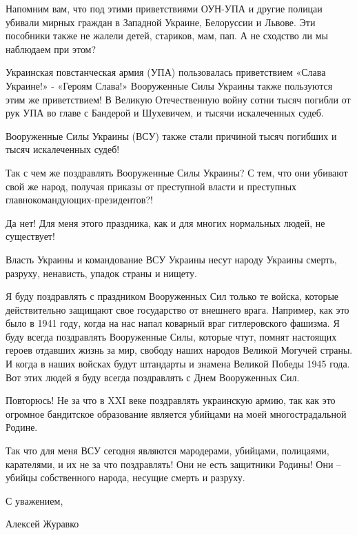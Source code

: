 Напомним вам, что под этими приветствиями ОУН-УПА и другие полицаи убивали
мирных граждан в Западной Украине, Белоруссии и Львове. Эти пособники также не
жалели детей, стариков, мам, пап. А не сходство ли мы наблюдаем при этом? 

Украинская повстанческая армия (УПА) пользовалась приветствием «Слава Украине!»
- «Героям Слава!» Вооруженные Силы Украины также пользуются этим же
приветствием! В Великую Отечественную войну сотни тысяч погибли от рук УПА во
главе с Бандерой и Шухевичем, и тысячи искалеченных судеб.

Вооруженные Силы Украины (ВСУ) также стали причиной тысяч погибших и тысяч
искалеченных судеб!

Так с чем же поздравлять Вооруженные Силы Украины? С тем, что они убивают свой
же народ, получая приказы от преступной власти и преступных
главнокомандующих-президентов?!

Да нет! Для меня этого праздника, как и для многих нормальных людей, не
существует!

Власть Украины и командование ВСУ Украины несут народу Украины смерть, разруху,
ненависть, упадок страны и нищету.

Я буду поздравлять с праздником Вооруженных Сил только те войска, которые
действительно защищают свое государство от внешнего врага. Например, как это
было в 1941 году, когда на нас напал коварный враг гитлеровского фашизма. Я
буду всегда поздравлять Вооруженные Силы, которые чтут, помнят настоящих героев
отдавших жизнь за мир, свободу наших народов Великой Могучей страны. И когда в
наших войсках будут штандарты и знамена Великой Победы 1945 года. Вот этих
людей я буду всегда поздравлять с Днем Вооруженных Сил.

Повторюсь! Не за что в XXI веке поздравлять украинскую армию, так как это
огромное бандитское образование является убийцами на моей многострадальной
Родине.

Так что для меня ВСУ сегодня являются мародерами, убийцами, полицаями,
карателями, и их не за что поздравлять! Они не есть защитники Родины! Они –
убийцы собственного народа, несущие смерть и разруху.

С уважением,

Алексей Журавко
